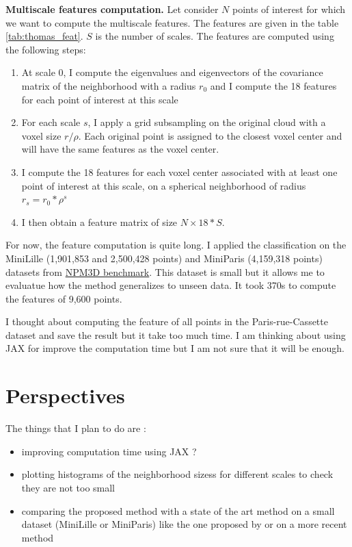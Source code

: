 \documentclass[a4paper, 11pt]{article}
\begin{document}
\textbf{Multiscale features computation.} Let consider $N$ points of interest for which we want to compute the multiscale features. The features are given in the table \ref{tab:thomas_feat}. $S$ is the number of scales. The features are computed using the following steps:

\begin{enumerate}
    \item At scale 0, I compute the eigenvalues and eigenvectors of the covariance matrix of the neighborhood with a radius $r_0$ and I compute the 18 features for each point of interest at this scale
    \item  For each scale $s$, I apply a grid subsampling on the original cloud with a voxel size $r/\rho$. Each original point is assigned to the closest voxel center and will have the same features as the voxel center. 
    \item I compute the 18 features for each voxel center associated with at least one point of interest at this scale, on a spherical neighborhood of radius $r_s = r_0 * \rho^s$
    \item I then obtain a feature matrix of size $N \times 18 * S$.
\end{enumerate}

For now, the feature computation is quite long. I applied the classification on the MiniLille (1,901,853 and 2,500,428 points) and MiniParis (4,159,318 points) datasets from \href{https://npm3d.fr/benchmark-for-master-course-on-3d-point-clouds}{NPM3D benchmark}. This dataset is small but it allows me to evaluatue how the method generalizes to unseen data. It took 370s to compute the features of 9,600 points. 

I thought about computing the feature of all points in the Paris-rue-Cassette dataset and save the result but it take too much time. I am thinking about using JAX for improve the computation time but I am not sure that it will be enough.



\section{Perspectives}
The things that I plan to do are :
\begin{itemize}
    \item improving computation time using JAX ?
    \item plotting histograms of the neighborhood sizess for different scales to check they are not too small
    \item comparing the proposed method with a state of the art method on a small dataset (MiniLille or MiniParis) like the one proposed by \cite{hackel_fast_nodate} or on a more recent method 
\end{itemize} 
\end{document}
